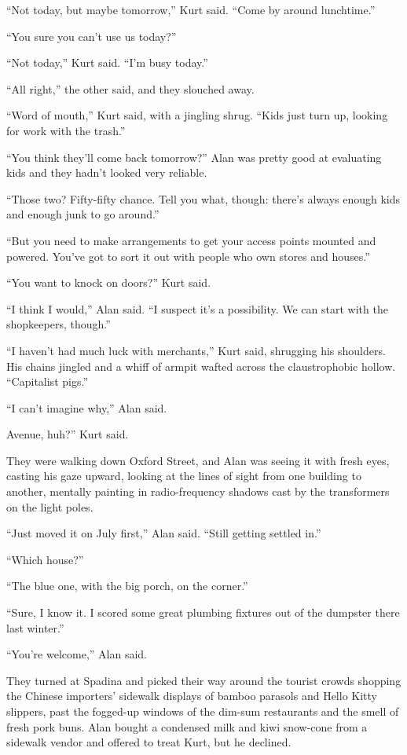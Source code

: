 ``Not today, but maybe tomorrow,'' Kurt said.  ``Come by around
lunchtime.''

``You sure you can't use us today?''

``Not today,'' Kurt said.  ``I'm busy today.''

``All right,'' the other said, and they slouched away.

``Word of mouth,'' Kurt said, with a jingling shrug.  ``Kids just turn
up, looking for work with the trash.''

``You think they'll come back tomorrow?'' Alan was pretty good at
evaluating kids and they hadn't looked very reliable.

``Those two?  Fifty-fifty chance.  Tell you what, though:  there's
always enough kids and enough junk to go around.''

``But you need to make arrangements to get your access points mounted
and powered.  You've got to sort it out with people who own stores and
houses.''

``You want to knock on doors?'' Kurt said.

``I think I would,'' Alan said.  ``I suspect it's a possibility.  We
can start with the shopkeepers, though.''

``I haven't had much luck with merchants,'' Kurt said, shrugging his
shoulders.  His chains jingled and a whiff of armpit wafted across the
claustrophobic hollow.  ``Capitalist pigs.''

``I can't imagine why,'' Alan said.

Avenue, huh?'' Kurt said.

They were walking down Oxford Street, and Alan was seeing it with
fresh eyes, casting his gaze upward, looking at the lines of sight
from one building to another, mentally painting in radio-frequency
shadows cast by the transformers on the light poles.

``Just moved it on July first,'' Alan said.  ``Still getting settled
in.''

``Which house?''

``The blue one, with the big porch, on the corner.''

``Sure, I know it.  I scored some great plumbing fixtures out of the
dumpster there last winter.''

``You're welcome,'' Alan said.

They turned at Spadina and picked their way around the tourist crowds
shopping the Chinese importers' sidewalk displays of bamboo parasols
and Hello Kitty slippers, past the fogged-up windows of the dim-sum
restaurants and the smell of fresh pork buns.  Alan bought a condensed
milk and kiwi snow-cone from a sidewalk vendor and offered to treat
Kurt, but he declined.

